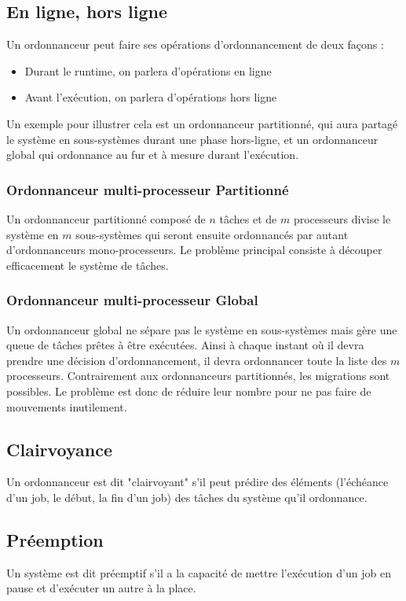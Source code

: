 \documentclass[11pt,a4paper,oneside]{report}
\begin{document}
	\subsection{En ligne, hors ligne}
	Un ordonnanceur peut faire ses opérations d'ordonnancement de deux façons : \medskip
	\begin{itemize}
		\item Durant le runtime, on parlera d'opérations en ligne
		\item Avant l'exécution, on parlera d'opérations hors ligne
	\end{itemize}
	Un exemple pour illustrer cela est un ordonnanceur partitionné, qui aura partagé le système 
	en sous-systèmes durant une phase hors-ligne, et un ordonnanceur global qui 
	ordonnance au fur et à mesure durant l'exécution. 
	
	
	\subsubsection{Ordonnanceur multi-processeur Partitionné}
	Un ordonnanceur partitionné composé de $n$ tâches et de $m$ processeurs divise 
	le système en $m$ sous-systèmes qui seront ensuite ordonnancés par autant d'ordonnanceurs 
	mono-processeurs. Le problème principal consiste à découper efficacement le système de tâches.
	
	\subsubsection{Ordonnanceur multi-processeur Global}
	Un ordonnanceur global ne sépare pas le système en sous-systèmes mais gère une 
	queue de tâches prêtes à être exécutées. Ainsi à chaque instant où il devra prendre une décision 
	d'ordonnancement, il devra ordonnancer toute la liste des $m$ processeurs.\medskip
	Contrairement aux ordonnanceurs partitionnés, les migrations sont possibles. Le problème 
	est donc de réduire leur nombre pour ne pas faire de mouvements inutilement.
	
	\subsection{Clairvoyance}
	Un ordonnanceur est dit "clairvoyant" s'il peut prédire des éléments (l'échéance d'un job, 
	le début, la fin d'un job) des tâches du système qu'il ordonnance.
	
	\subsection{Préemption} 
	Un système est dit préemptif s'il a la capacité 
	de mettre l'exécution d'un job en pause et d'exécuter un autre à la place. 
	
\end{document}
